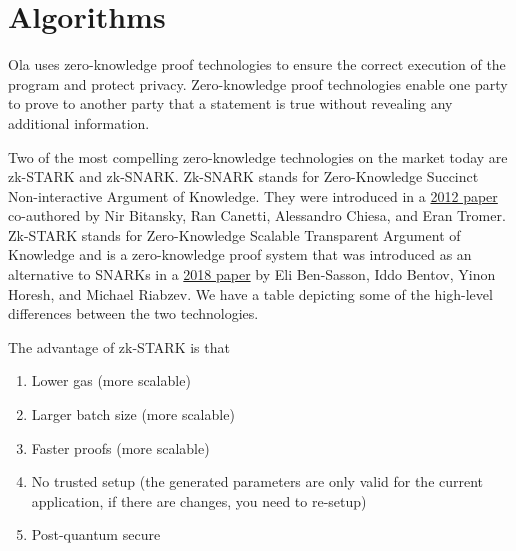 \section{Algorithms} \label{sec:algorithms}
Ola uses zero-knowledge proof technologies to ensure the correct execution of the program and protect privacy. Zero-knowledge proof technologies enable one party to prove to another party that a statement is true without revealing any additional information. 

Two of the most compelling zero-knowledge technologies on the market today are zk-STARK and zk-SNARK. Zk-SNARK stands for Zero-Knowledge Succinct Non-interactive Argument of Knowledge. They were introduced in a \href{https://dl.acm.org/doi/10.1145/2090236.2090263}{2012 paper} co-authored by Nir Bitansky, Ran Canetti, Alessandro Chiesa, and Eran Tromer. Zk-STARK stands for Zero-Knowledge Scalable Transparent Argument of Knowledge and is a zero-knowledge proof system that was introduced as an alternative to SNARKs in a \href{https://starkware.co/wp-content/uploads/2022/05/STARK-paper.pdf}{2018 paper} by Eli Ben-Sasson, Iddo Bentov, Yinon Horesh, and Michael Riabzev. We have a table depicting some of the high-level differences between the two technologies.

\begin{table}[!ht]
    \centering {}
    \end{table}

The advantage of zk-STARK is that
\begin{enumerate}
    \item Lower gas (more scalable)
    \item Larger batch size (more scalable)
    \item Faster proofs (more scalable)
    \item No trusted setup (the generated parameters are only valid for the current application, if there are changes, you need to re-setup)
    \item Post-quantum secure
\end{enumerate}

